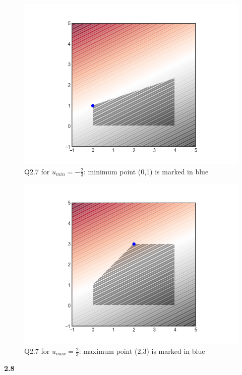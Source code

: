 \documentclass[fleqn]{article}
\begin{document}
\begin{figure}[h!]
\includegraphics[width=0.8\linewidth]{q2_7_u_min.PNG}
\caption{Q2.7 for $u_{min}=-\frac{2}{3}$: minimum point (0,1) is marked in blue}
\end{figure}

\begin{figure}[h!]
\includegraphics[width=0.8\linewidth]{q2_7_u_max.PNG}
\caption{Q2.7 for $u_{max}=\frac{2}{3}$: maximum point (2,3) is marked in blue}
\end{figure}

\textbf{2.8} \\
\end{document}
